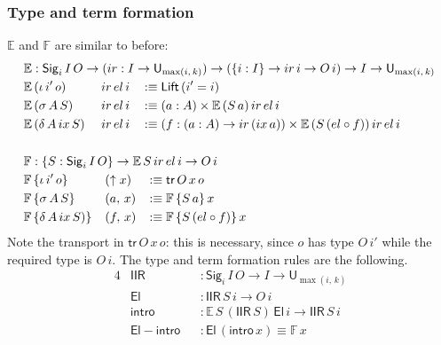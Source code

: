 \documentclass[acmsmall,screen,review,anonymous]{acmart}
\newcommand{\msf}[1]{{\mathsf{#1}}}
\newcommand{\mbb}[1]{\mathbb{#1}}
\newcommand{\U}{\msf{U}}
\newcommand{\El}{\msf{El}}
\newcommand{\Lift}{\msf{Lift}}
\newcommand{\lup}{\uparrow}
\newcommand{\Sig}{\msf{Sig}}
\newcommand{\ir}{{ir}}
\newcommand{\el}{{el}}
\newcommand{\ix}{{ix}}
\newcommand{\intro}{\msf{intro}}
\newcommand{\tr}{\msf{tr}}
\newcommand{\IIR}{\msf{IIR}}
\newcommand{\E}{\mbb{E}}
\newcommand{\F}{\mbb{F}}
\begin{document}
\subsubsection{Type and term formation}\label{sec:iir-type-and-term-formation}
$\E$ and $\F$ are similar to before:
\begin{alignat*}{4}
  &\hspace{-2em}\rlap{$\E : \Sig_i\,I\,O \to (\ir : I \to \U_{\max(i,\,k)}) \to (\{i : I\} \to \ir\,i \to O\,i) \to I \to \U_{\max(i,\,k)}$} \\
  &\hspace{-2em}\E\,(\iota\,i'\,o)     \,&&\hspace{-0.4em}\ir\,\el\,i &&\hspace{-0.6em} :\equiv \Lift\,(i' = i)\\
  &\hspace{-2em}\E\,(\sigma\,A\,S)     \,&&\hspace{-0.4em}\ir\,\el\,i &&\hspace{-0.6em} :\equiv (a : A) \times \E\,(S\,a)\,\ir\,\el\,i\\
  &\hspace{-2em}\E\,(\delta\,A\,\ix\,S)\,&&\hspace{-0.4em}\ir\,\el\,i &&\hspace{-0.6em} :\equiv (f : (a : A) \to \ir\,(\ix\,a)) \times \E\,(S\,(\el \circ f))\,\ir\,\el\,i\\
  &\hspace{-2em} && &&\\
  &\hspace{-2em}\rlap{$\F : \{S : \Sig_i\,I\,O\} \to \E\,S\,\ir\,\el\,i \to O\,i$} \\
  &\hspace{-2em}\F\,\{\iota\,i'\,o      \}\,&&\hspace{-0.1em}(\lup x) && \hspace{-0.2em}:\equiv \tr\,O\,x\,o\\
  &\hspace{-2em}\F\,\{\sigma\,A\,S      \}\,&&\hspace{-0.1em}(a,\,x)  && \hspace{-0.2em}:\equiv \F\,\{S\,a\}\,x\\
  &\hspace{-2em}\F\,\{\delta\,A\,\ix\,S)\}\,&&\hspace{-0.1em}(f,\,x)  && \hspace{-0.2em}:\equiv \F\,\{S\,(\el \circ f)\}\,x
\end{alignat*}
Note the transport in $\tr\,O\,x\,o$: this is necessary, since $o$ has type $O\,i'$ while the
required type is $O\,i$. The type and term formation rules are the following.
\begin{alignat*}{4}
  &\IIR               && : \Sig_i\,I\,O \to I \to \U_{\max(i,\,k)}\\
  &\El                && : \IIR\,S\,i \to O\,i\\
  &\intro             && : \E\,S\,(\IIR\,S)\,\El\,i \to \IIR\,S\,i\\
  &\msf{El\!\!-\!\!intro} && : \El\,(\intro\,x) \equiv \F\,x
\end{alignat*}
\end{document}
